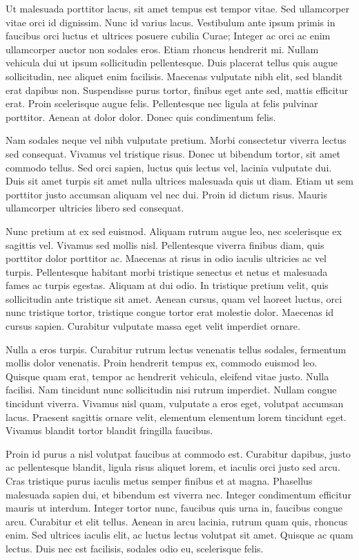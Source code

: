 \documentclass[]{article}
\begin{document}
Ut malesuada porttitor lacus, sit amet tempus est tempor vitae. Sed
ullamcorper vitae orci id dignissim. Nunc id varius lacus. Vestibulum
ante ipsum primis in faucibus orci luctus et ultrices posuere cubilia
Curae; Integer ac orci ac enim ullamcorper auctor non sodales eros.
Etiam rhoncus hendrerit mi. Nullam vehicula dui ut ipsum sollicitudin
pellentesque. Duis placerat tellus quis augue sollicitudin, nec aliquet
enim facilisis. Maecenas vulputate nibh elit, sed blandit erat dapibus
non. Suspendisse purus tortor, finibus eget ante sed, mattis efficitur
erat. Proin scelerisque augue felis. Pellentesque nec ligula at felis
pulvinar porttitor. Aenean at dolor dolor. Donec quis condimentum felis.

Nam sodales neque vel nibh vulputate pretium. Morbi consectetur viverra
lectus sed consequat. Vivamus vel tristique risus. Donec ut bibendum
tortor, sit amet commodo tellus. Sed orci sapien, luctus quis lectus
vel, lacinia vulputate dui. Duis sit amet turpis sit amet nulla ultrices
malesuada quis ut diam. Etiam ut sem porttitor justo accumsan aliquam
vel nec dui. Proin id dictum risus. Mauris ullamcorper ultricies libero
sed consequat.

Nunc pretium at ex sed euismod. Aliquam rutrum augue leo, nec
scelerisque ex sagittis vel. Vivamus sed mollis nisl. Pellentesque
viverra finibus diam, quis porttitor dolor porttitor ac. Maecenas at
risus in odio iaculis ultricies ac vel turpis. Pellentesque habitant
morbi tristique senectus et netus et malesuada fames ac turpis egestas.
Aliquam at dui odio. In tristique pretium velit, quis sollicitudin ante
tristique sit amet. Aenean cursus, quam vel laoreet luctus, orci nunc
tristique tortor, tristique congue tortor erat molestie dolor. Maecenas
id cursus sapien. Curabitur vulputate massa eget velit imperdiet ornare.

Nulla a eros turpis. Curabitur rutrum lectus venenatis tellus sodales,
fermentum mollis dolor venenatis. Proin hendrerit tempus ex, commodo
euismod leo. Quisque quam erat, tempor ac hendrerit vehicula, eleifend
vitae justo. Nulla facilisi. Nam tincidunt nunc sollicitudin nisi rutrum
imperdiet. Nullam congue tincidunt viverra. Vivamus nisl quam, vulputate
a eros eget, volutpat accumsan lacus. Praesent sagittis ornare velit,
elementum elementum lorem tincidunt eget. Vivamus blandit tortor blandit
fringilla faucibus.

Proin id purus a nisl volutpat faucibus at commodo est. Curabitur
dapibus, justo ac pellentesque blandit, ligula risus aliquet lorem, et
iaculis orci justo sed arcu. Cras tristique purus iaculis metus semper
finibus et at magna. Phasellus malesuada sapien dui, et bibendum est
viverra nec. Integer condimentum efficitur mauris ut interdum. Integer
tortor nunc, faucibus quis urna in, faucibus congue arcu. Curabitur et
elit tellus. Aenean in arcu lacinia, rutrum quam quis, rhoncus enim. Sed
ultrices iaculis elit, ac luctus lectus volutpat sit amet. Quisque ac
quam lectus. Duis nec est facilisis, sodales odio eu, scelerisque felis.
\end{document}
